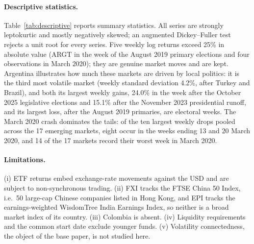 \paragraph{Descriptive statistics.} Table~\ref{tab:descriptive} reports summary statistics. All series are strongly leptokurtic and mostly negatively skewed; an augmented Dickey--Fuller test rejects a unit root for every series. Five weekly log returns exceed 25\% in absolute value (ARGT in the week of the August 2019 primary elections and four observations in March 2020); they are genuine market moves and are kept. Argentina illustrates how much these markets are driven by local politics: it is the third most volatile market (weekly standard deviation 4.2\%, after Turkey and Brazil), and both its largest weekly gains, 24.0\% in the week after the October 2025 legislative elections and 15.1\% after the November 2023 presidential runoff, and its largest loss, after the August 2019 primaries, are electoral weeks. The March 2020 crash dominates the tails: of the ten largest weekly drops pooled across the 17 emerging markets, eight occur in the weeks ending 13 and 20 March 2020, and 14 of the 17 markets record their worst week in March 2020.

\begin{table}[ht]
\centering\scriptsize
\caption{Descriptive statistics of weekly log returns, 2011-03-11 to 2026-10-23 (816 weeks). Kurtosis is not in excess.}
\label{tab:descriptive}

\end{table}

\paragraph{Limitations.} (i) ETF returns embed exchange-rate movements against the USD and are subject to non-synchronous trading. (ii) FXI tracks the FTSE China 50 Index, i.e.\ 50 large-cap Chinese companies listed in Hong Kong, and EPI tracks the earnings-weighted WisdomTree India Earnings Index, so neither is a broad market index of its country. (iii) Colombia is absent. (iv) Liquidity requirements and the common start date exclude younger funds. (v) Volatility connectedness, the object of the base paper, is not studied here.
